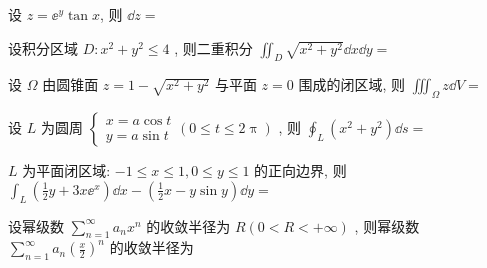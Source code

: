\begin{ti}
	设 $z=\ee^{y} \tan x$, 则 $\dd{z}=$ \kuo
\end{ti}

\begin{ti}
	设积分区域 $D : x^{2}+y^{2} \leqslant 4$ , 则二重积分 $\iint_{D} \sqrt{x^{2}+y^{2}} \dd{x} \dd{y}=$ \kuo
\end{ti}

\begin{ti}
	设 $\Omega$ 由圆锥面 $z=1-\sqrt{x^{2}+y^{2}}$ 与平面 $z=0$ 围成的闭区域, 则 $\iiint_{\Omega} z \dd{V}=$ \kuo
\end{ti}

\begin{ti}
	设 $L$ 为圆周 $\begin{cases}
		x=a \cos t\\
		y=a \sin t
	\end{cases}(0\leqslant t\leqslant 2\uppi)$ , 则 $\oint_{L}\left(x^{2}+y^{2}\right) \dd{s}=$ \kuo
\end{ti}

\begin{ti}
	$L$ 为平面闭区域: $-1 \leqslant x \leqslant 1,0 \leqslant y \leqslant 1$ 的正向边界, 则 $\int_{L}\left(\frac{1}{2} y+3 x \ee^{x}\right) \dd{x}-\left(\frac{1}{2} x-y \sin y\right) \dd{y}=$ \kuo
\end{ti}

\begin{ti}
	设幂级数 $\sum_{n=1}^{\infty} a_{n} x^{n}$ 的收敛半径为 $R(0<R<+\infty)$ , 则幂级数 $\sum_{n=1}^{\infty} a_{n}\left(\frac{x}{2}\right)^{n}$ 的收敛半径为 \kuo
\end{ti}

